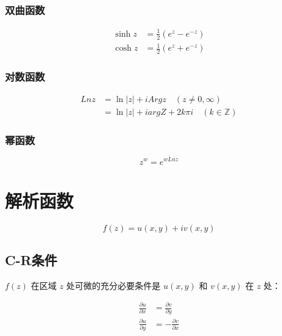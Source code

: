 \documentclass{article}
\begin{document}
\subsubsection{双曲函数}

\begin{equation}
    \begin{aligned}
        \sinh z &= \frac{1}{2} (e^z - e^{-z}) \\
        \cosh z &= \frac{1}{2} (e^z + e^{-z})
    \end{aligned}
\end{equation}

\subsubsection{对数函数}

\begin{equation}
    \begin{aligned}
        Ln z &= \ln \left\lvert z \right\rvert + i Arg z \quad (z \neq 0,\infty) \\
             &= \ln \left\lvert z \right\rvert + i arg Z + 2k\pi i \quad (k \in \mathbb{Z})
    \end{aligned}
\end{equation}

\subsubsection{幂函数}

\begin{equation}
    z^w = e^{w Ln z}
\end{equation}

\section{解析函数}

\begin{equation}
    f(z) = u(x,y) + iv(x,y)
\end{equation}

\subsection{C-R条件}

$f(z)$ 在区域 $z$ 处可微的充分必要条件是 $u(x,y)$ 和 $v(x,y)$ 在 $z$ 处：

\begin{equation} \label{CR}
    \begin{aligned}
        \frac{\partial u}{\partial x} &= \frac{\partial v}{\partial y} \\
        \frac{\partial u}{\partial y} &= -\frac{\partial v}{\partial x}
    \end{aligned}
\end{equation}
\end{document}
